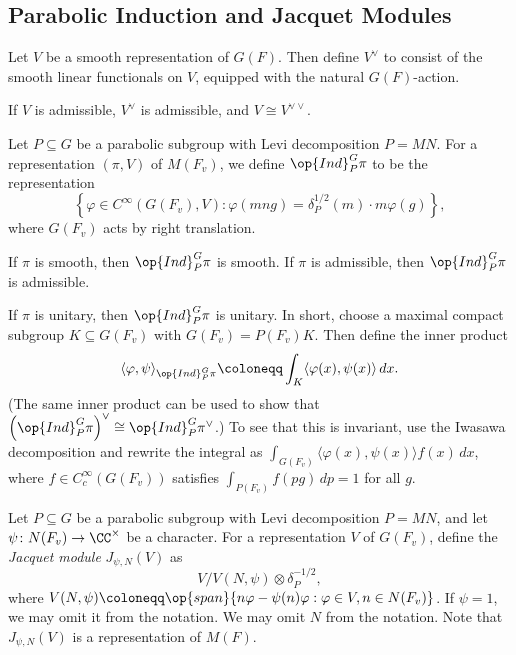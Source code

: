 \documentclass{article}
\begin{document}
\subsection{Parabolic Induction and Jacquet Modules}
\begin{definition}[contragredient]
	Let $V$ be a smooth representation of $G(F)$. Then define $V^\lor$ to consist of the smooth linear functionals on $V$, equipped with the natural $G(F)$-action.
\end{definition}
\begin{remark}
	If $V$ is admissible, $V^\lor$ is admissible, and $V\cong V^{\lor\lor}$.
\end{remark}
\begin{definition}
	Let $P\subseteq G$ be a parabolic subgroup with Levi decomposition $P=MN$. For a representation $(\pi,V)$ of $M(F_v)$, we define $\op{Ind}_P^G\pi$ to be the representation
	\[\left\{\varphi\in C^\infty(G(F_v),V):\varphi(mng)=\delta_P^{1/2}(m)\cdot m\varphi(g)\right\},\]
	where $G(F_v)$ acts by right translation.
\end{definition}
\begin{remark}
	If $\pi$ is smooth, then $\op{Ind}_P^G\pi$ is smooth. If $\pi$ is admissible, then $\op{Ind}_P^G\pi$ is admissible.
\end{remark}
\begin{remark}
	If $\pi$ is unitary, then $\op{Ind}_P^G\pi$ is unitary. In short, choose a maximal compact subgroup $K\subseteq G(F_v)$ with $G(F_v)=P(F_v)K$. Then define the inner product
	\[\langle\varphi,\psi\rangle_{\op{Ind}_P^G\pi}\coloneqq\int_{K}\langle\varphi(x),\psi(x)\rangle\,dx.\]
	(The same inner product can be used to show that $\left(\op{Ind}_P^G\pi\right)^\lor\cong\op{Ind}_P^G\pi^\lor$.) To see that this is invariant, use the Iwasawa decomposition and rewrite the integral as $\int_{G(F_v)}\langle\varphi(x),\psi(x)\rangle f(x)\,dx$, where $f\in C_c^\infty(G(F_v))$ satisfies $\int_{P(F_v)}f(pg)\,dp=1$ for all $g$.
\end{remark}
\begin{definition}
	Let $P\subseteq G$ be a parabolic subgroup with Levi decomposition $P=MN$, and let $\psi\colon N(F_v)\to\CC^\times$ be a character. For a representation $V$ of $G(F_v)$, define the \textit{Jacquet module} $J_{\psi,N}(V)$ as
	\[V/V(N,\psi)\otimes\delta_P^{-1/2},\]
	where $V(N,\psi)\coloneqq\op{span}\{n\varphi-\psi(n)\varphi:\varphi\in V,n\in N(F_v)\}$. If $\psi=1$, we may omit it from the notation. We may omit $N$ from the notation. Note that $J_{\psi,N}(V)$ is a representation of $M(F)$.
\end{definition}
\end{document}
